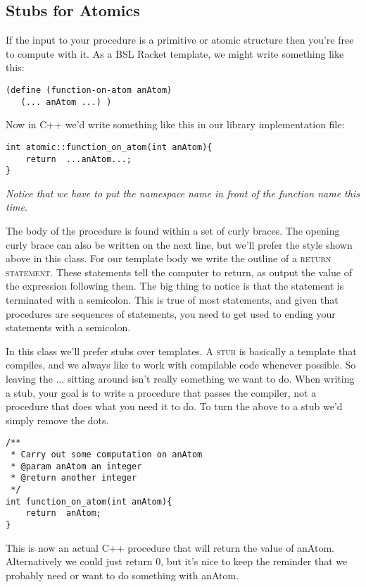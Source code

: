 \documentclass[]{tufte-handout}
\begin{document}
\subsection{Stubs for Atomics}

If the input to your procedure is a primitive or atomic structure then you're free to compute with it. As a BSL Racket template, we might write something like this:
\begin{verbatim}
(define (function-on-atom anAtom)
   (... anAtom ...) )
\end{verbatim}

Now in C++ we'd write something like this in our library implementation file:
\begin{verbatim}
int atomic::function_on_atom(int anAtom){
    return	...anAtom...;	
}
\end{verbatim}
\textit{Notice that we have to put the namespace name in front of the function name this time.}

The body of the procedure is found within a set of curly braces. The opening curly brace can also be written on the next line, but we'll prefer the style shown above in this class.  For our template body we write the outline of a \textsc{return statement}.  These statements tell the computer to return, as output the value of the expression following them.  The big thing to notice is that the statement is terminated with a semicolon. This is true of most statements, and given that procedures are sequences of statements, you need to get used to ending your statements with a semicolon. 

In this class we'll prefer stubs over templates.  A \textsc{stub} is basically a template that compiles, and we always like to work with compilable code whenever possible. So leaving the ... sitting around isn't really something we want to do.  When writing a stub, your goal is to write a procedure that passes the compiler, not a procedure that does what you need it to do.  To turn the above to a stub we'd simply remove the dots.
\begin{verbatim}
/**
 * Carry out some computation on anAtom
 * @param anAtom an integer
 * @return another integer
 */
int function_on_atom(int anAtom){
    return	anAtom;	
}
\end{verbatim}
This is now an actual C++ procedure that will return the value of anAtom.  Alternatively we could just return 0, but it's nice to keep the reminder that we probably need or want to do something with anAtom. 
\end{document}
